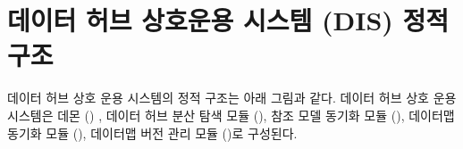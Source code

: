 \documentclass[a4paper,10pt,english]{sphinxmanual}
\begin{document}

\begin{DUlineblock}{0em}
\item[] 
\item[] 
\end{DUlineblock}


\section{데이터 허브 상호운용 시스템 (DIS) 정적 구조}
\label{\detokenize{intro:dis}}
\sphinxAtStartPar
데이터 허브 상호 운용 시스템의 정적 구조는 아래 그림과  같다.
데이터 허브 상호 운용 시스템은 데몬 ({\hyperref[\detokenize{Daemon:daemonmodule}]{}}) , 데이터 허브 분산 탐색 모듈 ({\hyperref[\detokenize{DHSearch:dhsearchmodule}]{}}),
참조 모델 동기화 모듈 ({\hyperref[\detokenize{RMSync:rmsyncmodule}]{}}), 데이터맵 동기화 모듈 ({\hyperref[\detokenize{SessionManager:sessionmanagermodule}]{}}),
데이터맵 버전 관리 모듈 ({\hyperref[\detokenize{VersionControl:versioncontrolmodule}]{}})로 구성된다.


\begin{DUlineblock}{0em}
\item[] 
\end{DUlineblock}
\end{document}
